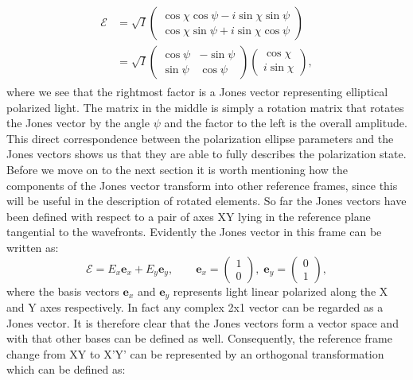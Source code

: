 \begin{align}
\begin{split}
    \bm{\mathcal{E}} &=
    \sqrt{I}
    \begin{pmatrix}
    \cos \chi \cos \psi - i\sin \chi \sin \psi \\
    \cos \chi \sin \psi + i\sin \chi \cos \psi
    \end{pmatrix}
    \\
    &=
    \sqrt{I}
    \begin{pmatrix}
    \cos \psi & -\sin \psi \\
    \sin \psi & \cos \psi
    \end{pmatrix}
    \begin{pmatrix}
    \cos \chi \\
    i\sin \chi
    \end{pmatrix},
\end{split}
\end{align}
where we see that the rightmost factor is a Jones vector representing elliptical polarized light. The matrix in the middle is simply a rotation matrix that rotates the Jones vector by the angle $\psi$ and the factor to the left is the overall amplitude. This direct correspondence between the polarization ellipse parameters and the Jones vectors shows us that they are able to fully describes the polarization state. Before we move on to the next section it is worth mentioning how the components of the Jones vector transform into other reference frames, since this will be useful in the description of rotated elements. So far the Jones vectors have been defined with respect to a pair of axes XY lying in the reference plane tangential to the wavefronts. Evidently the Jones vector in this frame can be written as:
\begin{equation}
    \bm{\mathcal{E}} = E_x \bm{e}_x + E_y \bm{e}_y, \qquad 
    \bm{e}_x = 
    \begin{pmatrix}
    1 \\
    0
    \end{pmatrix},
    \;
    \bm{e}_y = 
    \begin{pmatrix}
    0 \\
    1
    \end{pmatrix},
\end{equation}
where the basis vectors $\bm{e}_x$ and $\bm{e}_y$ represents light linear polarized along the X and Y axes respectively. In fact any complex 2x1 vector can be regarded as a Jones vector. It is therefore clear that the Jones vectors form a vector space and with that other bases can be defined as well. Consequently, the reference frame change from XY to X'Y' can be represented by an orthogonal transformation which can be defined as:

